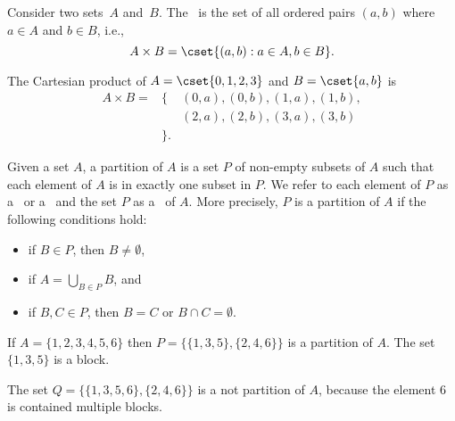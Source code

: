 \begin{flex}
\begin{definition}
Consider two sets~$A$ and~$B$.  The~ is the set of all ordered pairs $(a,b)$ where $a \in A$ and $b
\in B$, i.e.,
%
\[
A \times B = \cset{(a,b) : a \in A, b \in B}.
\]
\end{definition}

\begin{example}
\label{ex:bg::sets::cartesian}
The Cartesian product of $A = \cset{0,1,2,3}$ and $B = \cset{a,b}$ is
\[
\begin{array}{lll}
A \times B = & \{ & (0,a),(0,b),(1,a),(1,b),
\\
             &    & (2,a),(2,b),(3,a),(3,b) 
\\
             & \}.
\end{array}
\]
\end{example}
\end{flex}

\begin{flex}
\begin{definition}
Given a set $A$, a partition of $A$ is a set $P$ of non-empty subsets
of $A$ such that each element of $A$ is in exactly one subset in $P$.
%
We refer to each element of $P$ as a~ or a~ and
the set $P$ as a~ of $A$.
%
More precisely, $P$ is a partition of $A$ if the following conditions
hold:
\begin{itemize}
\item if $B \in P$, then $B \not= \emptyset$,
\item if $A = \bigcup_{B \in P}{B}$, and
\item if $B, C \in P$, then $B = C$ or $B \cap C = \emptyset$.
\end{itemize}
\end{definition}

\begin{example}
If $A = \{1, 2, 3, 4, 5, 6 \}$ then $P = \{ \{1,3,5\}, \{2, 4, 6\} \}$
is a partition of $A$.  The set $\{1,3,5\}$ is a block.

The set $Q = \{ \{1,3,5,6\}, \{2, 4, 6\} \}$ is a not partition of
$A$, because the element $6$ is contained multiple blocks.
\end{example}
\end{flex}

